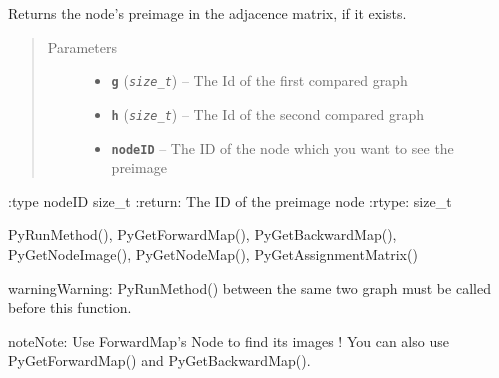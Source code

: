 \documentclass[letterpaper,10pt,english]{sphinxmanual}
\begin{document}
\begin{fulllineitems}
\label{doc:PythonGedLib.PyGetNodePreImage}
Returns the node's preimage in the adjacence matrix, if it exists.
\begin{quote}\begin{description}
\item[{Parameters}] \leavevmode\begin{itemize}
\item {} 
\textbf{\texttt{g}} (\emph{\texttt{size\_t}}) -- The Id of the first compared graph

\item {} 
\textbf{\texttt{h}} (\emph{\texttt{size\_t}}) -- The Id of the second compared graph

\item {} 
\textbf{\texttt{nodeID}} -- The ID of the node which you want to see the preimage

\end{itemize}

\end{description}\end{quote}

:type nodeID size\_t
:return: The ID of the preimage node
:rtype: size\_t




PyRunMethod(), PyGetForwardMap(), PyGetBackwardMap(), PyGetNodeImage(), PyGetNodeMap(), PyGetAssignmentMatrix()



\begin{notice}{warning}{Warning:}
PyRunMethod() between the same two graph must be called before this function.
\end{notice}

\begin{notice}{note}{Note:}
Use ForwardMap's Node to find its images ! You can also use PyGetForwardMap() and PyGetBackwardMap().
\end{notice}

\end{fulllineitems}

\end{document}
